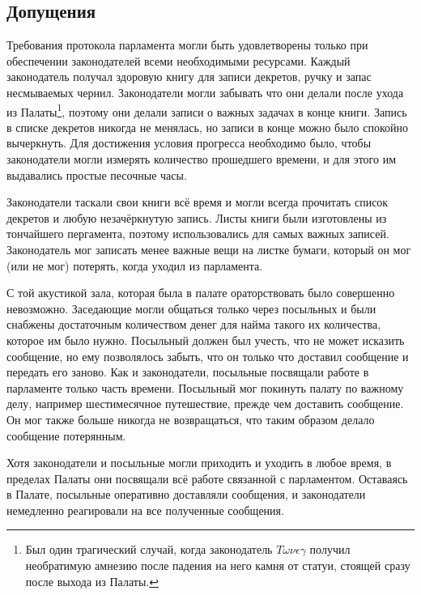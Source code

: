 \documentclass[12pt, a4paper]{article} %
\begin{document}

\subsection{Допущения}

Требования протокола парламента могли быть удовлетворены только при обеспечении законодателей всеми необходимыми ресурсами. Каждый законодатель получал здоровую книгу для записи декретов, ручку и запас несмываемых чернил. Законодатели могли забывать что они делали после ухода из Палаты\footnote{Был один трагический случай, когда законодатель $T\omega\nu\epsilon\gamma$ получил необратимую амнезию после падения на него камня от статуи, стоящей сразу после выхода из Палаты.}, поэтому они делали записи о важных задачах в конце книги. Запись в списке декретов никогда не менялась, но записи в конце можно было спокойно вычеркнуть. Для достижения условия прогресса необходимо было, чтобы законодатели могли измерять количество прошедшего времени, и для этого им выдавались простые песочные часы.

Законодатели таскали свои книги всё время и могли всегда прочитать список декретов и любую незачёркнутую запись. Листы книги были изготовлены из тончайшего пергамента, поэтому использовались для самых важных записей. Законодатель мог записать менее важные вещи на листке бумаги, который он мог (или не мог) потерять, когда уходил из парламента.

С той акустикой зала, которая была в палате ораторствовать было совершенно невозможно. Заседающие могли общаться только через посыльных и были снабжены достаточным количеством денег для найма такого их количества, которое им было нужно. Посыльный должен был учесть, что не может исказить сообщение, но ему позволялось забыть, что он только что доставил сообщение и передать его заново. Как и законодатели, посыльные посвящали работе в парламенте только часть времени. Посыльный мог покинуть палату по важному делу, например шестимесячное путешествие, прежде чем доставить сообщение. Он мог также больше никогда не возвращаться, что таким образом делало сообщение потерянным.

Хотя законодатели и посыльные могли приходить и уходить в любое время, в пределах Палаты они посвящали всё работе связанной с парламентом. Оставаясь в Палате, посыльные оперативно доставляли сообщения, и  законодатели немедленно реагировали на все полученные сообщения.
\end{document}

